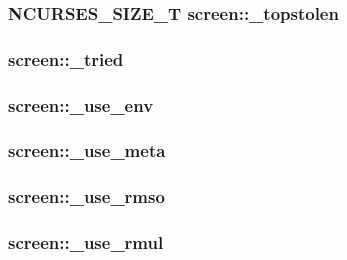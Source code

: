 \hypertarget{structscreen_a16718bc21f2b8988d43a45f44e688e26}{
\subsubsection[{\-\_\-topstolen}]{\setlength{\rightskip}{0pt plus 5cm}N\-C\-U\-R\-S\-E\-S\-\_\-\-S\-I\-Z\-E\-\_\-\-T screen\-::\-\_\-topstolen}}\label{structscreen_a16718bc21f2b8988d43a45f44e688e26}
\hypertarget{structscreen_a1da96d4833f835308d531e3aae1a9f6b}{
\subsubsection[{\-\_\-tried}]{ screen\-::\-\_\-tried}}\label{structscreen_a1da96d4833f835308d531e3aae1a9f6b}
\hypertarget{structscreen_ab3d264d67173168c34ff3c47e5e54d3b}{
\subsubsection[{\-\_\-use\-\_\-env}]{ screen\-::\-\_\-use\-\_\-env}}\label{structscreen_ab3d264d67173168c34ff3c47e5e54d3b}
\hypertarget{structscreen_a5a943ad8162a59f6f565b13606e55a7d}{
\subsubsection[{\-\_\-use\-\_\-meta}]{ screen\-::\-\_\-use\-\_\-meta}}\label{structscreen_a5a943ad8162a59f6f565b13606e55a7d}
\hypertarget{structscreen_a1e21aef9b18a4684a1bff4849d69dc9d}{
\subsubsection[{\-\_\-use\-\_\-rmso}]{ screen\-::\-\_\-use\-\_\-rmso}}\label{structscreen_a1e21aef9b18a4684a1bff4849d69dc9d}
\hypertarget{structscreen_a852b9ab77875602817d0efa57b676b8e}{
\subsubsection[{\-\_\-use\-\_\-rmul}]{ screen\-::\-\_\-use\-\_\-rmul}}\label{structscreen_a852b9ab77875602817d0efa57b676b8e}
